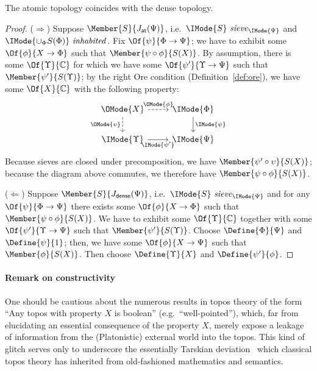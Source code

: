 \documentclass{article}
\newcommand\IsSieve[2]{\IMode{#2}\ \mathit{sieve}_{\IMode{#1}}}
\newcommand\JAtomic{J_{\mathsf{at}}}
\newcommand\JDense{J_{\mathsf{dense}}}
\newcommand\IsInh[1]{\IMode{#1}\ \mathit{inhabited}}
\begin{document}
\begin{lem}\label{lem:atomic-dense}
  The atomic topology coincides with the dense topology.
\end{lem}
\begin{proof}
  ($\Rightarrow$) Suppose $\Member{S}{\JAtomic(\Psi)}$, i.e.\
  $\IsSieve{\Psi}{S}$ and $\IsInh{\cup_\Phi S(\Phi)}$. Fix
  $\Of{\psi}{\Phi\to\Psi}$; we have to exhibit some
  $\Of{\phi}{X\to\Phi}$ such that $\Member{\psi\circ\phi}{S(X)}$.
  By assumption, there is some $\Of{\Upsilon}{\mathbb{C}}$ for which we
  have some $\Of{\psi'}{\Upsilon\to\Psi}$ such that
  $\Member{\psi'}{S(\Upsilon)}$; by the right Ore condition
  (Definition~\ref{def:ore}), we have some $\Of{X}{\mathbb{C}}$ with
  the following property:
  \[
    \begin{tikzcd}
      \OMode{X}
      \arrow[r,dashed,"\OMode{\phi}"]
      \arrow[d,dashed,swap,"\OMode{\upsilon}"]
      &
      \IMode{\Phi}
      \arrow[d,"\IMode{\psi}"]
      \\
      \IMode{\Upsilon}
      \arrow[r,swap,"\IMode{\psi'}"]
      &
      \IMode{\Psi}
    \end{tikzcd}
  \]
  Because sieves are closed under precomposition, we have
  $\Member{\psi'\circ \upsilon}{S(X)}$; because the diagram above
  commutes, we therefore have $\Member{\psi\circ\phi}{S(X)}$.

  ($\Leftarrow$) Suppose $\Member{S}{\JDense(\Psi)}$, i.e.\
  $\IsSieve{\Psi}{S}$ and for any $\Of{\psi}{\Phi\to\Psi}$ there
  exists some $\Of{\phi}{X\to\Phi}$ such that
  $\Member{\psi\circ\phi}{S(X)}$. We have to exhibit some
  $\Of{\Upsilon}{\mathbb{C}}$ together with some
  $\Of{\psi'}{\Upsilon\to\Psi}$ such that
  $\Member{\psi'}{S(\Upsilon)}$.
  Choose $\Define{\Phi}{\Psi}$ and $\Define{\psi}{1}$; then, we have
  some $\Of{\phi}{X\to\Psi}$ such that $\Member{\phi}{S(X)}$. Then
  choose $\Define{\Upsilon}{X}$ and $\Define{\psi'}{\phi}$.

\end{proof}

\paragraph{Remark on constructivity}

One should be cautious about the numerous results in topos theory of
the form ``Any topos with property $X$ is boolean'' (e.g.\
``well-pointed''), which, far from elucidating an essential
consequence of the property $X$, merely expose a leakage of
information from the (Platonistic) external world into the topos. This
kind of glitch serves only to underscore the essentially Tarskian
deviation~\cite{girard:2011} which classical topos theory has
inherited from old-fashioned mathematics and semantics.
\end{document}
